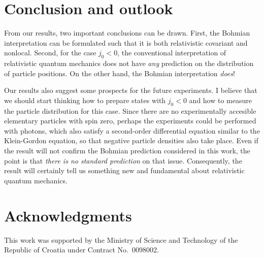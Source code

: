 \documentclass[10pt,twoside]{aipproc} %
\begin{document}
\section{Conclusion and outlook}
  
From our results, two important conclusions can be drawn.
First, the
Bohmian interpretation can be formulated such that 
it is both relativistic covariant and nonlocal. 
Second, for the case $j_0<0$, the
conventional interpretation of relativistic quantum mechanics  
does not have {\em any} prediction on the distribution of particle positions. 
On the other hand, the Bohmian interpretation {\em does}! 

Our results also suggest some
prospects for the future experiments. I believe that
we should start thinking how to prepare states with $j_0<0$
and how to measure the particle distribution for this case.
Since there are no experimentally 
accesible elementary particles with spin zero, perhaps the 
experiments could be performed with photons, which also 
satisfy a second-order differential equation similar to the 
Klein-Gordon equation, so that negative particle densities 
also take place.
Even if the result will not confirm the Bohmian prediction 
considered in this work, the point is that {\em there is no
standard prediction} on that issue. Consequently,
the result will certainly tell us something new and fundamental about 
relativistic quantum mechanics. 


\section*{Acknowledgments}

This work was supported by the Ministry of Science and Technology of the
Republic of Croatia under Contract No.~0098002.
 
\end{document}
